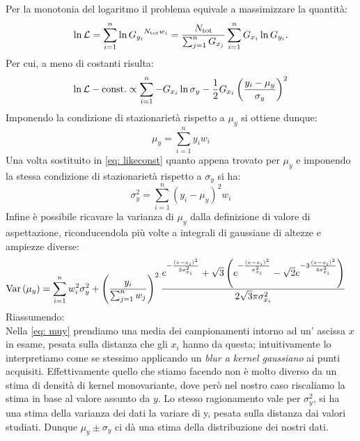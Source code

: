 \documentclass{article}[a4paper, oneside, 11pt]
\begin{document}
Per la monotonia del logaritmo il problema equivale a massimizzare la quantità:
\[
	\ln{\mathcal L} = \sum_{i=1}^{n}\ln{G_{y_i}}^{N_{\text{tot}}w_i} = 
	\frac{N_{\text{tot}}} {\sum_{j=1}^{n} G_{x_j}} 
	\sum_{i=1}^{n} G_{x_i} \ln{G_{y_i}}
.\] 
Per cui, a meno di costanti risulta:
\begin{equation}\label{eq: likeconst}
	\ln{\mathcal L} - \text{const.} \propto \sum_{i=1}^{n} -G_{x_i} \ln{\sigma_y}
	- \frac{1}{2} G_{x_i} \left( \frac{y_i - \mu_y}{\sigma_y} \right)^2
\end{equation}
Imponendo la condizione di stazionarietà rispetto a $\mu_y$ si ottiene dunque:
\begin{equation}\label{eq: muy}
	\mu_y = \sum_{i=1}^{n} y_i w_i 
\end{equation} 
Una volta sostituito in \eqref{eq: likeconst} quanto appena trovato per $\mu_y$
e imponendo la stessa condizione di stazionarietà rispetto a $\sigma_y$ si ha:
\begin{equation}\label{eq: sigmay}
	\sigma_y^2 = \sum_{i=1}^{n} (y_i - \mu_y)^2 w_i
\end{equation}
Infine è possibile ricavare la varianza di $\mu_y$ dalla definizione di valore
di aspettazione, riconducendola più volte a integrali di gaussiane di altezze
e ampiezze diverse:
\begin{align} \label{aln: varmuy}
	\text{Var}\left(\mu_y\right) &= \sum_{i=1}^{n} w_i^2 \sigma_y^2 + 
	\left(\frac{y_i}{\sum_{j=1}^{n} w_j} \right)^2 \frac{
	e^{-\frac{(x-x_i)^2}{3 \sigma_{x_i}^2}} +  
	\sqrt{3} \left( e^{-\frac{(x-x_i)^2}{\sigma_{x_i}^2}} -
	\sqrt{2} e^{-3 \frac{(x-x_i)^2}{4 \sigma_{x_i}^2}} \right)
	} {2 \sqrt{3}\pi \sigma_{x_i}^2} 
\end{align}
Riassumendo:\\
Nella \eqref{eq: muy} prendiamo una media dei campionamenti intorno ad un'
ascissa $x$ in esame, pesata sulla distanza che gli $x_i$ hanno da questa; 
intuitivamente lo interpretiamo come se stessimo applicando un 
\emph{blur a kernel gaussiano} ai punti acquisiti.
Effettivamente quello che stiamo facendo non è molto diverso da un stima
di densità di kernel monovariante, dove però nel nostro caso
riscaliamo la stima in base al valore assunto da $y$.
Lo stesso ragionamento vale per $\sigma_y^2$, si ha una stima della varianza
dei dati la variare di y, pesata sulla distanza dai valori studiati. Dunque
$\mu_y \pm \sigma_y$ ci dà una stima della distribuzione dei nostri dati.
\end{document}
